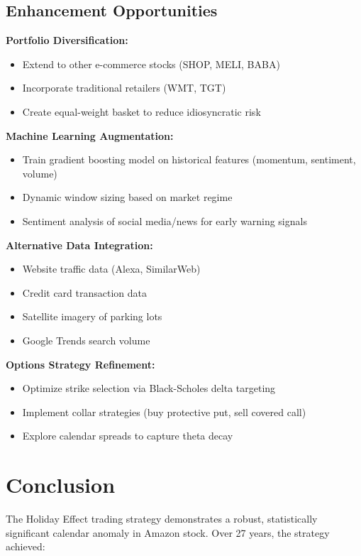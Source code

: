 \documentclass[twocolumn,ieee]{arithmaxresearch}
\begin{document}
\subsection{Enhancement Opportunities}

\textbf{Portfolio Diversification:}
\begin{itemize}
    \item Extend to other e-commerce stocks (SHOP, MELI, BABA)
    \item Incorporate traditional retailers (WMT, TGT)
    \item Create equal-weight basket to reduce idiosyncratic risk
\end{itemize}

\textbf{Machine Learning Augmentation:}
\begin{itemize}
    \item Train gradient boosting model on historical features (momentum, sentiment, volume)
    \item Dynamic window sizing based on market regime
    \item Sentiment analysis of social media/news for early warning signals
\end{itemize}

\textbf{Alternative Data Integration:}
\begin{itemize}
    \item Website traffic data (Alexa, SimilarWeb)
    \item Credit card transaction data
    \item Satellite imagery of parking lots
    \item Google Trends search volume
\end{itemize}

\textbf{Options Strategy Refinement:}
\begin{itemize}
    \item Optimize strike selection via Black-Scholes delta targeting
    \item Implement collar strategies (buy protective put, sell covered call)
    \item Explore calendar spreads to capture theta decay
\end{itemize}

\section{Conclusion}

The Holiday Effect trading strategy demonstrates a robust, statistically significant calendar anomaly in Amazon stock. Over 27 years, the strategy achieved:
\end{document}
